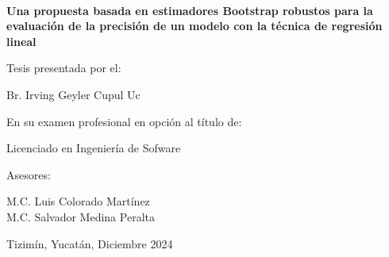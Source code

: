 \documentclass[12pt]{article}
\begin{document}
	\hskip -0.9cm
	\begin{minipage}[c][1\totalheight][s]{1cm}
		\begin{center}
			\hskip2pt\vrule width3.5pt height19.5cm\hskip1mm
			\vrule width0.5pt height19.5cm\\[10pt]
		\end{center}
	\end{minipage}\hspace{0.5cm}\begin{minipage}[c][1\totalheight][s]{14cm}
		\begin{center}
			\vspace{1.5cm}
			
			{\selectfont\Large\textbf{Una propuesta basada en estimadores Bootstrap robustos para la evaluación de la precisión de un modelo con la técnica de regresión lineal}}
			
			\vspace{1cm}
			{{\selectfont\large Tesis presentada por el:}}\\
			
			\vspace{0.5cm}
			
			{{\selectfont\large Br. Irving Geyler Cupul Uc}}\\
			
			\vspace{1.5cm}
			
			{\selectfont\large En su examen profesional en opción al título de:}
			
			\vspace{0.5cm}
			
			{\selectfont\large Licenciado en Ingeniería de Sofware}
			
			\vspace{1.2cm}
			
			{\selectfont\large Asesores:}
			
			\vspace{0.5cm}
			
			{\selectfont\large M.C. Luis Colorado Martínez\\M.C. Salvador Medina Peralta}
			
			\vspace{4cm}
			{{\selectfont Tizimín, Yucatán, Diciembre 2024}}
		\end{center}
	\end{minipage}
	\newpage
	
	
	\newpage
	\tableofcontents
	\newpage
	
	\newpage
	\setcounter{page}{1}      %
	
	\newpage
	
	\newpage
	
	\newpage
	
	\newpage
	
	\newpage
	
	\newpage
	\printbibliography
	\newpage
	
	
\end{document}
